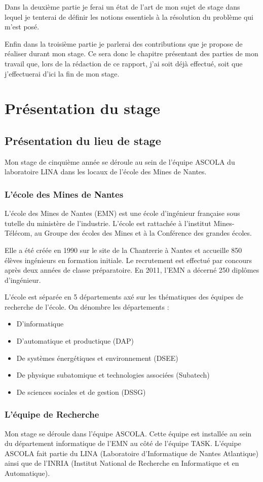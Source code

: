 \documentclass[a4paper, 11pt]{report}
\begin{document}
Dans la deuxième partie je ferai un état de l'art de mon sujet de stage dans lequel je tenterai de définir les notions essentiels à la résolution du problème qui m'est posé.

Enfin dans la troisième partie je parlerai des contributions que je propose de réaliser durant mon stage. Ce sera donc le chapitre présentant des parties de mon travail que, lors de la rédaction de ce rapport, j'ai soit déjà effectué, soit que j'effectuerai d'ici la fin de mon stage.

\chapter{Présentation du stage}
\section{Présentation du lieu de stage}
Mon stage de cinquième année se déroule au sein de l’équipe ASCOLA du laboratoire LINA dans les locaux de l’école des Mines de Nantes.
\subsection{L'école des Mines de Nantes}
L’école des Mines de Nantes (EMN) est une école d’ingénieur française sous tutelle du ministère de l’industrie. L’école est rattachée à l’institut Mines-Télécom, au Groupe des écoles des Mines et à la Conférence des grandes écoles.

Elle a été créée en 1990 sur le site de la Chantrerie à Nantes et accueille 850 élèves ingénieurs en formation initiale. Le recrutement est effectué par concours après deux années de classe préparatoire. En 2011, l’EMN a décerné 250 diplômes d’ingénieur.

L’école est séparée en 5 départements axé sur les thématiques des équipes de recherche de l'école. On dénombre les départements :
\begin{itemize}
	\item D'informatique
	\item D'automatique et productique (DAP)
	\item De systèmes énergétiques et environnement (DSEE)
	\item De physique subatomique et technologies associées (Subatech)
	\item De sciences sociales et de gestion (DSSG)
\end{itemize}

\subsection{L'équipe de Recherche}
Mon stage se déroule dans l'équipe ASCOLA. Cette équipe est installée au sein du département informatique de l’EMN au côté de l'équipe TASK. L'équipe ASCOLA fait partie du LINA (Laboratoire d'Informatique de Nantes Atlantique) ainsi que de l'INRIA (Institut National de Recherche en Informatique et en Automatique).
\end{document}
